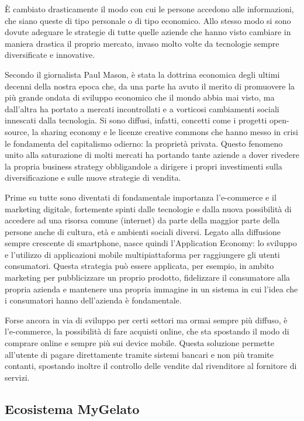 È cambiato drasticamente il modo con cui le persone accedono alle informazioni, che siano queste di tipo personale o di tipo economico.
Allo stesso modo si sono dovute adeguare le strategie di tutte quelle aziende che hanno visto cambiare in maniera drastica il proprio mercato, invaso molto volte da tecnologie sempre diversificate e innovative.

Secondo il giornalista Paul Mason, è stata la dottrina economica degli ultimi decenni della nostra epoca che, da una parte ha avuto il merito di promuovere la più grande ondata di sviluppo economico che il mondo abbia mai visto, ma dall’altra ha portato a mercati incontrollati e a vorticosi cambiamenti sociali innescati dalla tecnologia.
Si sono diffusi, infatti, concetti come i progetti open-source, la sharing economy e le licenze creative commons che hanno messo in crisi le fondamenta del capitalismo odierno: la proprietà privata. 
Questo fenomeno unito alla saturazione di molti mercati ha portando tante aziende a dover rivedere la propria business strategy obbligandole a dirigere i propri investimenti sulla diversificazione e sulle nuove strategie di vendita. \autocite{POSTCAPITALISMO}

Prime su tutte sono diventati di fondamentale importanza l'e-commerce e il marketing digitale, fortemente spinti dalle tecnologie e dalla nuova possibilità di accedere ad una risorsa comune (internet) da parte della maggior parte della persone anche di cultura, età e ambienti sociali diversi.
Legato alla diffusione sempre crescente di smartphone, nasce quindi l'Application Economy: lo sviluppo e l'utilizzo di applicazioni mobile multipiattaforma per raggiungere gli utenti consumatori.
Questa strategia può essere applicata, per esempio, in ambito marketing per pubblicizzare un proprio prodotto, fidelizzare il consumatore alla propria azienda e mantenere una propria immagine in un sistema in cui l'idea che i consumatori hanno dell'azienda è fondamentale.

Forse ancora in via di sviluppo per certi settori ma ormai sempre più diffuso, è l'e-commerce, la possibilità di fare acquisti online, che sta spostando il modo di comprare online e sempre più sui device mobile. Questa soluzione permette all'utente di pagare direttamente tramite sistemi bancari e non più tramite contanti, spostando inoltre il controllo delle vendite dal rivenditore al fornitore di servizi.

\subsection{Ecosistema MyGelato}

